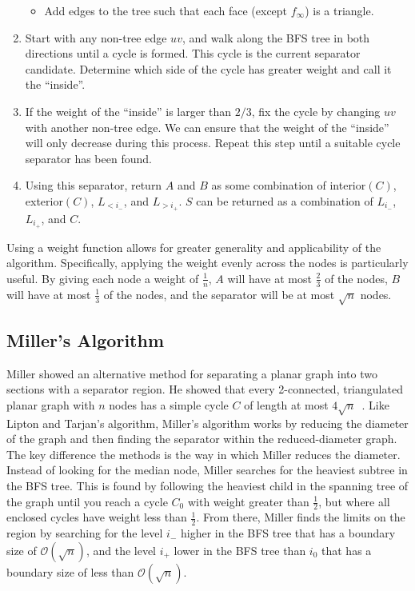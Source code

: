 \documentclass[11pt]{article}
\begin{document}
\begin{enumerate}
\begin{itemize}
        \item Add edges to the tree such that each face (except $f_{\infty}$) is a triangle.
    \end{itemize}

    \item Start with any non-tree edge $uv$, and walk along the BFS tree in both directions until a cycle is formed. This cycle is the current separator candidate. Determine which side of the cycle has greater weight and call it the ``inside''.

    \item If the weight of the ``inside'' is larger than $2/3$, fix the cycle by changing $uv$ with another non-tree edge. We can ensure that the weight of the ``inside'' will only decrease during this process. Repeat this step until a suitable cycle separator has been found.

    \item Using this separator, return $A$ and $B$ as some combination of interior$(C)$, exterior$(C)$, $L_{< i_-}$, and $L_{> i_+}$. $S$ can be returned as a combination of $L_{i_-}$, $L_{i_+}$, and $C$.

\end{enumerate}

Using a weight function allows for greater generality and applicability of the algorithm. Specifically, applying the weight evenly across the nodes is particularly useful. By giving each node a weight of $\frac{1}{n}$, $A$ will have at most $\frac{2}{3}$ of the nodes, $B$ will have at most $\frac{1}{3}$ of the nodes, and the separator will be at most $\sqrt{n}$ nodes.

\subsection{Miller's Algorithm}
\label{sec:graph-sep-miller}

Miller showed an alternative method for separating a planar graph into two sections with a separator region. He showed that every 2-connected, triangulated planar graph with $n$ nodes has a simple cycle $C$ of length at most $4\sqrt{n}$~\cite{miller1984finding}. Like Lipton and Tarjan's algorithm, Miller's algorithm works by reducing the diameter of the graph and then finding the separator within the reduced-diameter graph. The key difference the methods is the way in which Miller reduces the diameter. Instead of looking for the median node, Miller searches for the heaviest subtree in the BFS tree. This is found by following the heaviest child in the spanning tree of the graph until you reach a cycle $C_0$ with weight greater than $\frac{1}{2}$, but where all enclosed cycles have weight less than $\frac{1}{2}$. From there, Miller finds the limits on the region by searching for the level $i_-$ higher in the BFS tree that has a boundary size of $\mathcal{O}(\sqrt{n})$, and the level $i_+$ lower in the BFS tree than $i_0$ that has  a boundary size of less than $\mathcal{O}(\sqrt{n})$.
\end{document}

